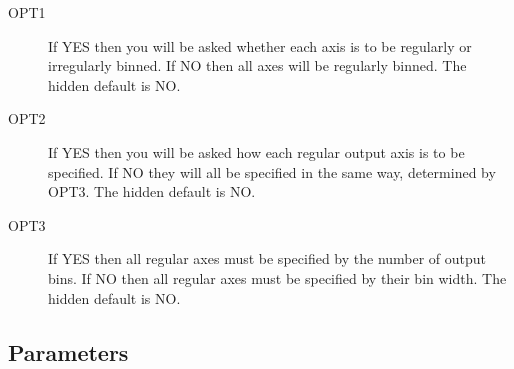 \documentclass{book}
\renewcommand{\_}{{\tt\char'137}}     %
\begin{document}
\begin{description}
\item[OPT1]
If YES then you will be asked whether each axis is to
be regularly or irregularly binned.
If NO then all axes will be regularly binned.
The hidden default is NO.
\item[OPT2]
If YES then you will be asked how each regular output
axis is to be specified.
If NO they will all be specified in the same way,
determined by OPT3.
The hidden default is NO.
\item[OPT3]
If YES then all regular axes must be specified by the
number of output bins.
If NO then all regular axes must be specified by
their bin width.
The hidden default is NO.
\end{description}

\subsection{Parameters}
\end{document}
